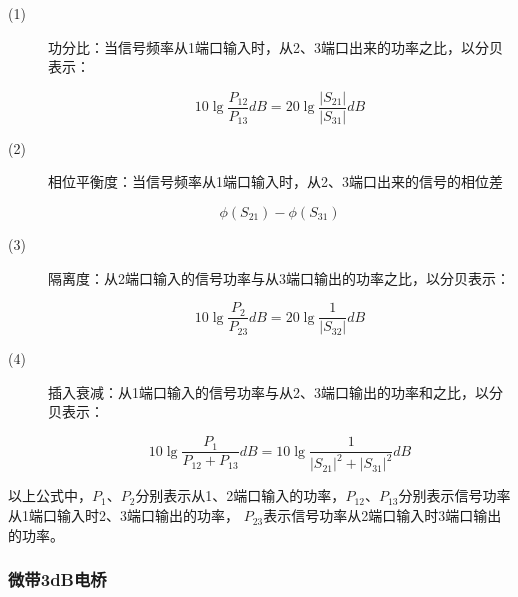 \documentclass[UTF8]{ctexart}
\begin{document}
\begin{description}
    \item[(1)] 功分比：当信号频率从1端口输入时，从2、3端口出来的功率之比，以分贝表示：
    
    $$
    10\lg\frac{P_{12}}{P_{13}}dB=20\lg\frac{\left|S_{21}\right|}{\left|S_{31}\right|}dB
    $$

    \item[(2)] 相位平衡度：当信号频率从1端口输入时，从2、3端口出来的信号的相位差
    
    $$
    \phi(S_{21})-\phi(S_{31})
    $$
    
    \item[(3)] 隔离度：从2端口输入的信号功率与从3端口输出的功率之比，以分贝表示：
    
    $$
    10\lg\frac{P_2}{P_{23}}dB=20\lg\frac{1}{\left|S_{32}\right|}dB
    $$

    \item[(4)] 插入衰减：从1端口输入的信号功率与从2、3端口输出的功率和之比，以分贝表示：
    
    $$
    10\lg\frac{P_1}{P_{12}+P_{13}}dB=10\lg\frac{1}{\left|S_{21}\right|^2+\left|S_{31}\right|^2}dB
    $$
\end{description}

以上公式中，$P_1$、$P_2$分别表示从1、2端口输入的功率，$P_{12}$、$P_{13}$分别表示信号功率从1端口输入时2、3端口输出的功率，
$P_{23}$表示信号功率从2端口输入时3端口输出的功率。


\subsubsection{微带3dB电桥}
\end{document}
